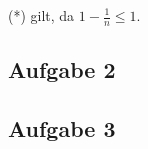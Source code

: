 \documentclass[11pt,a4paper,ngerman]{article}
\begin{document}
(*) gilt, da $1- \frac{1}{n} \leq 1$.

\subsection*{Aufgabe 2}

\subsection*{Aufgabe 3}

\label{LastPage}
\end{document}
